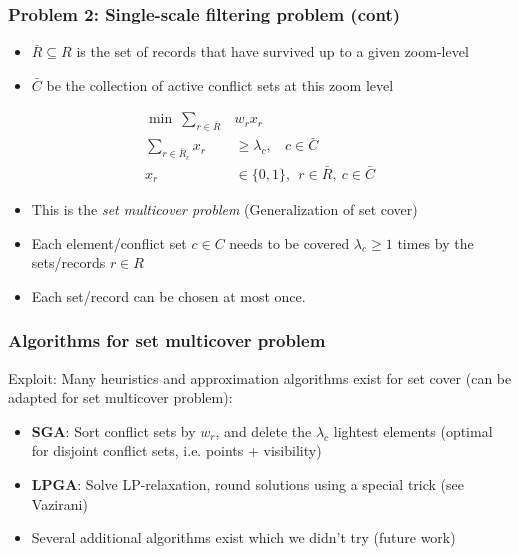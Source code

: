 \documentclass{beamer}
\begin{document}
\frame
{
  \frametitle{Problem 2: Single-scale filtering problem (cont)}
  
  \begin{itemize}
  \item $\bar{R} \subseteq R$ is the set of records that have survived up to a given zoom-level
  \item $\bar{C}$ be the collection of active conflict sets at this zoom level
  \end{itemize}

  \begin{align}
  \label{eq:objective-single}
  \min ~\sum_{r \in \bar{R}} &w_r x_r \\
  \label{eq:general-constraints-single}
  \sum_{r \in \bar{R}_c} x_r &\geq \lambda_c, ~~~~ c \in \bar{C} \\
  x_r & \in \{0, 1\}, ~~ r \in \bar{R}, ~c \in \bar{C}
  \end{align}

  \begin{itemize}
  \item This is the \emph{set multicover problem} (Generalization of set cover)
  \item Each element/conflict set $c \in C$ needs to be covered $\lambda_c \geq 1$ times by the sets/records $r \in R$
  \item Each set/record can be chosen at most once.
  \end{itemize}

}

\frame
{
  \frametitle{Algorithms for set multicover problem}
  Exploit: Many heuristics and approximation algorithms exist for set cover (can be adapted for set multicover problem):
  \begin{itemize}
  \item \textbf{SGA}: Sort conflict sets by $w_r$, and delete the $\lambda_c$ lightest elements (optimal for disjoint conflict sets, i.e. points + visibility)
  \item \textbf{LPGA}: Solve LP-relaxation, round solutions using a special trick (see Vazirani)
  \item Several additional algorithms exist which we didn't try (future work)
  \end{itemize}
}
\end{document}
